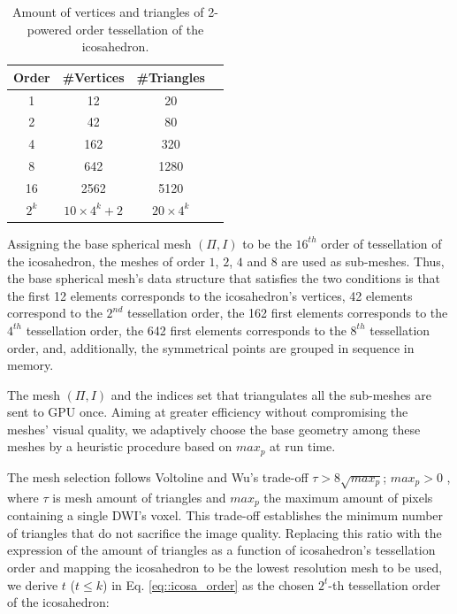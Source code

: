 \documentclass[twoside,twocolumn,10pt]{article}
\begin{document}
\begin{table}[]
\centering
\begin{tabular}{|c|c|c|c|}
\hline
\textbf{Order} & \textbf{\#Vertices} & \textbf{\#Triangles} \\ \hline
1              & 12                 & 20                  \\ \hline
2              & 42                 & 80                 \\ \hline
4              & 162                & 320                 \\ \hline
8              & 642                & 1280                \\ \hline
16             & 2562               & 5120                \\ \hline
$2^k$          & $10\times 4^k + 2$ & $20\times 4^k$           \\ \hline
\end{tabular}
\caption{Amount of vertices and triangles of 2-powered order tessellation of the icosahedron.}%
\label{tab::icosahedron_set}
\end{table}

Assigning the base spherical mesh $(\Pi, I)$ to be the $16^{th}$ order of tessellation of the icosahedron, the meshes of order $1$, $2$, $4$ and $8$ are used as sub-meshes. Thus, the base spherical mesh's data structure that satisfies the two conditions is that the first 12 elements corresponds to the icosahedron's vertices, 42 elements correspond to the $2^{nd}$ tessellation order, the 162 first elements corresponds to the $4^{th}$ tessellation order, the 642 first elements corresponds to the $8^{th}$ tessellation order, and, additionally, the symmetrical points are grouped in sequence in memory. %

The mesh $(\Pi, I)$ and the indices set that triangulates all the sub-meshes are sent to GPU once. Aiming at greater efficiency without compromising the meshes' visual quality, we adaptively choose the base geometry among these meshes by a heuristic procedure based on $max_p$ at run time.

The mesh selection follows Voltoline and Wu's trade-off $\tau > 8\sqrt{max_p}$; $max_p > 0$ \cite{voltoline2021}, where $\tau$ is mesh amount of triangles and $max_p$ the maximum amount of pixels containing a single DWI's voxel. This trade-off establishes the minimum number of triangles that do not sacrifice the image quality. Replacing this ratio with the expression of the amount of triangles as a function of icosahedron's tessellation order and mapping the icosahedron to be the lowest resolution mesh to be used, we derive $t$ ($t \leq k$) in Eq. \ref{eq::icosa_order} as the chosen $2^{t}$-th tessellation order of the icosahedron:
\end{document}
